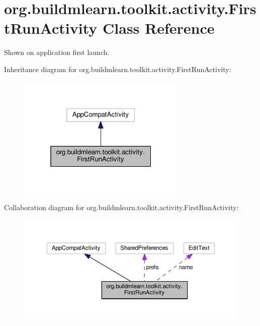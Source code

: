 \hypertarget{classorg_1_1buildmlearn_1_1toolkit_1_1activity_1_1FirstRunActivity}{}\section{org.\+buildmlearn.\+toolkit.\+activity.\+First\+Run\+Activity Class Reference}
\label{classorg_1_1buildmlearn_1_1toolkit_1_1activity_1_1FirstRunActivity}


Shown on application first launch.  




Inheritance diagram for org.\+buildmlearn.\+toolkit.\+activity.\+First\+Run\+Activity\+:
\nopagebreak
\begin{figure}[H]
\begin{center}
\leavevmode
\includegraphics[width=229pt]{classorg_1_1buildmlearn_1_1toolkit_1_1activity_1_1FirstRunActivity__inherit__graph}
\end{center}
\end{figure}


Collaboration diagram for org.\+buildmlearn.\+toolkit.\+activity.\+First\+Run\+Activity\+:
\nopagebreak
\begin{figure}[H]
\begin{center}
\leavevmode
\includegraphics[width=350pt]{classorg_1_1buildmlearn_1_1toolkit_1_1activity_1_1FirstRunActivity__coll__graph}
\end{center}
\end{figure}
